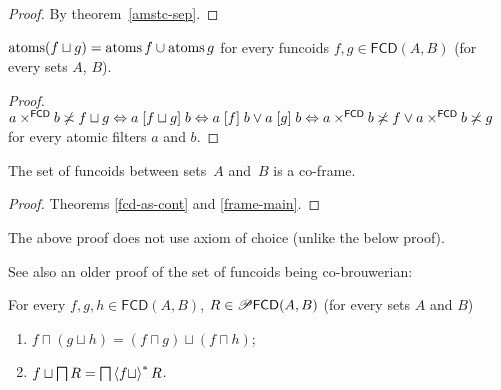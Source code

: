 \begin{proof}
By theorem~\ref{amstc-sep}.\end{proof}
\begin{prop}
$\operatorname{atoms}(f\sqcup g)=\operatorname{atoms} f\cup\operatorname{atoms} g$ for every funcoids
$f,g\in\mathsf{FCD}(A,B)$
(for every sets $A$, $B$).\end{prop}
\begin{proof}
$a\times^{\mathsf{FCD}}b\not\asymp f\sqcup g\Leftrightarrow a\mathrel{\left[f\sqcup
g\right]}b\Leftrightarrow a\mathrel{\left[f\right]}b\lor a\mathrel{\left[g\right]}b\Leftrightarrow
a\times^{\mathsf{FCD}}b\not\asymp f\lor a\times^{\mathsf{FCD}}b\not\asymp g$
for every atomic filters $a$ and $b$.\end{proof}
\begin{thm}
The set of funcoids between sets~$A$ and~$B$ is a co-frame.\end{thm}
\begin{proof}
Theorems \ref{fcd-as-cont} and \ref{frame-main}.\end{proof}
\begin{rem}
The above proof does not use axiom of choice (unlike the below proof).
\end{rem}
See also an older proof of the set of funcoids being co-brouwerian:
\begin{thm}
For every $f,g,h\in\mathsf{FCD}(A,B)$, $R\in\mathscr{P}\mathsf{FCD}(A,B)$
(for every sets $A$ and $B$)
\begin{enumerate}
\item \label{fcd-dist-j}$f\sqcap(g\sqcup h)=(f\sqcap g)\sqcup(f\sqcap h)$;
\item \label{fcd-dist-m}$f\sqcup\bigsqcap R=\bigsqcap\left\langle f\sqcup\right\rangle ^{\ast}R$.
\end{enumerate}
\end{thm}
